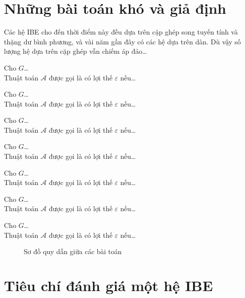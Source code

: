 \documentclass[class=report, crop=false]{standalone}
\begin{document}
	\section{Những bài toán khó và giả định}
		Các hệ IBE cho đến thời điểm này đều dựa trên cặp ghép song tuyến tính và thặng dư bình phương, và vài năm gần đây có các hệ dựa trên dàn. Dù vậy số lượng hệ dựa trên cặp ghép vẫn chiếm áp đảo\dots
		\begin{dl}
			Cho $G$\dots\\
			Thuật toán $\mathcal{A}$ được gọi là có lợi thế $\varepsilon$ nếu\dots

		\end{dl}
		\begin{cdh}
			Cho $G$\dots\\
			Thuật toán $\mathcal{A}$ được gọi là có lợi thế $\varepsilon$ nếu\dots

		\end{cdh}
		\begin{ddh}
			Cho $G$\dots\\
			Thuật toán $\mathcal{A}$ được gọi là có lợi thế $\varepsilon$ nếu\dots

		\end{ddh}
		\begin{cbdh}
			Cho $G$\dots\\
			Thuật toán $\mathcal{A}$ được gọi là có lợi thế $\varepsilon$ nếu\dots

		\end{cbdh}
		\begin{dbdh}
			Cho $G$\dots\\
			Thuật toán $\mathcal{A}$ được gọi là có lợi thế $\varepsilon$ nếu\dots

		\end{dbdh}
		\begin{cbdhe}
			Cho $G$\dots\\
			Thuật toán $\mathcal{A}$ được gọi là có lợi thế $\varepsilon$ nếu\dots

		\end{cbdhe}
		\begin{dbdhe}
			Cho $G$\dots\\
			Thuật toán $\mathcal{A}$ được gọi là có lợi thế $\varepsilon$ nếu\dots

		\end{dbdhe}
		\begin{figure}
			\caption{Sơ đồ quy dẫn giữa các bài toán}
		\end{figure}
	\section{Tiêu chí đánh giá một hệ IBE}
\end{document}
